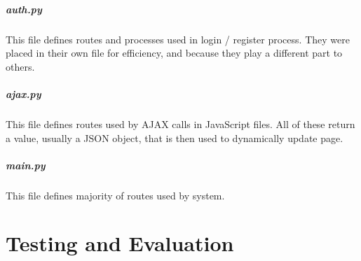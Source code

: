 \documentclass{article}[12pt,a4paper]
\begin{document}
\subsubsection{auth.py}
This file defines routes and processes used in login / register process. They were placed in their own file for efficiency, and because they play a different part to others.


\subsubsection{ajax.py}
This file defines routes used by AJAX calls in JavaScript files. All of these return a value, usually a JSON object, that is then used to dynamically update page.


\subsubsection{main.py}
This file defines majority of routes used by system.


\cleardoublepage


\part{Testing and Evaluation}

\end{document}

